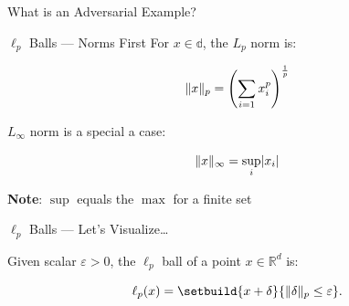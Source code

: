 \begin{frame}{What is an Adversarial Example?}
\end{frame}

\begin{frame}{$\ell_{p}$ Balls --- Norms First}
  For ${x \in \mathbb{d}}$, the $L_{p}$ norm is:

  \begin{equation}\label{eq:LpNorm}
    \lVert x\rVert_{p} = \left( \sum_{i=1} x_{i}^{p}  \right)^{\frac{1}{p}}
  \end{equation}

  $L_{\infty}$ norm is a special a case:

  \begin{equation}\label{eq:LinftyNorm}
    \lVert x\rVert_{\infty} = \sup_{i} \lvert x_i\rvert
  \end{equation}

  \begin{center}
    \textbf{Note}: $\sup$ equals the $\max$ for a finite set
  \end{center}
\end{frame}

\begin{frame}{$\ell_{p}$ Balls --- Let's Visualize\ldots}
  \begin{definition}
    Given scalar ${\varepsilon > 0}$, the $\ell_{p}$ ball of a point ${x \in \mathbb{R}^{d}}$ is:

    \begin{equation}\label{eq:LpBall}
      \ell_{p}(x) = \setbuild{x + \delta}{\norm{\delta}_{p} \leq \varepsilon}\text{.}
    \end{equation}
  \end{definition}

\end{frame}



